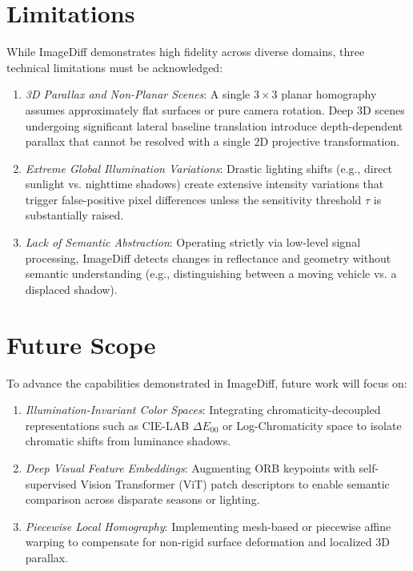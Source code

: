 \documentclass[conference]{IEEEtran}
\begin{document}
\section{Limitations}
While ImageDiff demonstrates high fidelity across diverse domains, three technical limitations must be acknowledged:
\begin{enumerate}
    \item \textit{3D Parallax and Non-Planar Scenes}: A single $3 \times 3$ planar homography assumes approximately flat surfaces or pure camera rotation. Deep 3D scenes undergoing significant lateral baseline translation introduce depth-dependent parallax that cannot be resolved with a single 2D projective transformation.
    \item \textit{Extreme Global Illumination Variations}: Drastic lighting shifts (e.g., direct sunlight vs. nighttime shadows) create extensive intensity variations that trigger false-positive pixel differences unless the sensitivity threshold $\tau$ is substantially raised.
    \item \textit{Lack of Semantic Abstraction}: Operating strictly via low-level signal processing, ImageDiff detects changes in reflectance and geometry without semantic understanding (e.g., distinguishing between a moving vehicle vs. a displaced shadow).
\end{enumerate}

\section{Future Scope}
To advance the capabilities demonstrated in ImageDiff, future work will focus on:
\begin{enumerate}
    \item \textit{Illumination-Invariant Color Spaces}: Integrating chromaticity-decoupled representations such as CIE-LAB $\Delta E_{00}$ or Log-Chromaticity space to isolate chromatic shifts from luminance shadows.
    \item \textit{Deep Visual Feature Embeddings}: Augmenting ORB keypoints with self-supervised Vision Transformer (ViT) patch descriptors to enable semantic comparison across disparate seasons or lighting.
    \item \textit{Piecewise Local Homography}: Implementing mesh-based or piecewise affine warping to compensate for non-rigid surface deformation and localized 3D parallax.
\end{enumerate}
\end{document}
